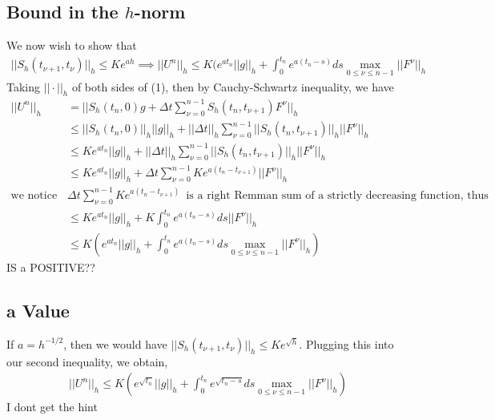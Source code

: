 \subsection{Bound in the $h$-norm}
We now wish to show that 
\begin{align*}
||S_h(t_{\nu+1},t_{\nu})||_h \leq Ke^{ah} \implies ||U^n||_h \leq K(e^{at_n} ||g||_h + \int_0^{t_n} e^{a(t_n-s)} ds \max_{0\leq \nu \leq n-1} ||F^{\nu}||_h
\end{align*}
Taking $||\cdot ||_h$ of both sides of (1), then by Cauchy-Schwartz inequality, we have
\begin{align*}
||U^n||_h &= ||S_h(t_n,0)g+\Delta t \sum_{\nu = 0}^{n-1} S_h(t_n , t_{\nu + 1}) F^{\nu} ||_h \\
&\leq ||S_h(t_n,0)||_h||g||_h+||\Delta t||_h \sum_{\nu = 0}^{n-1} ||S_h(t_n , t_{\nu + 1})||_h || F^{\nu} ||_h \\
&\leq Ke^{at_n}||g||_h+||\Delta t||_h \sum_{\nu = 0}^{n-1} ||S_h(t_n , t_{\nu + 1})||_h || F^{\nu} ||_h\\
&\leq Ke^{at_n}||g||_h+\Delta t \sum_{\nu = 0}^{n-1} Ke^{a(t_n - t_{\nu+1})} || F^{\nu} ||_h\\ 
\text{we notice that} \enspace & \Delta t \sum_{\nu = 0}^{n-1} Ke^{a(t_n - t_{\nu+1})} \enspace \text{is a right Remman sum of a strictly decreasing function, thus} \\
&\leq Ke^{at_n}||g||_h+ K\int_0^{t_n} e^{a(t_n - s)} ds || F^{\nu} ||_h\\ 
&\leq K(e^{at_n}||g||_h+ \int_0^{t_n} e^{a(t_n - s)} ds \max_{0\leq \nu \leq n-1} ||F^{\nu}||_h)
\end{align*}
IS a POSITIVE??
\subsection{a Value}
If $a = h^{-1/2}$, then we would have $||S_h(t_{\nu + 1}, t_{\nu})||_h \leq Ke^{\sqrt{h}}$. Plugging this into our second inequality, we obtain, 
\begin{align*}
||U^n||_h\leq K(e^{\sqrt{t_n}}||g||_h+ \int_0^{t_n} e^{\sqrt{t_n - s}} ds \max_{0\leq \nu \leq n-1} ||F^{\nu}||_h)
\end{align*}
I dont get the hint